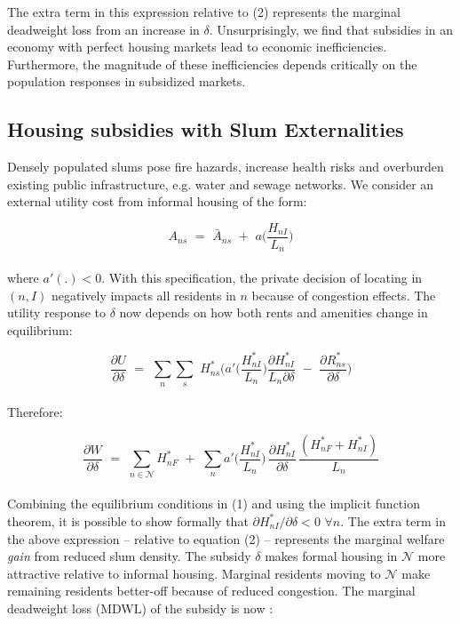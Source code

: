 \documentclass[12pt]{article}
\begin{document}
  The extra term in this expression relative to (2) represents the marginal deadweight loss from an increase in $\delta$. Unsurprisingly, we find that subsidies in an economy with perfect housing markets lead to economic inefficiencies. Furthermore, the magnitude of these inefficiencies depends critically on the population responses in subsidized markets.

 \subsection*{Housing subsidies with Slum Externalities}

 Densely populated slums pose fire hazards, increase health risks and overburden existing public infrastructure, e.g. water and sewage networks. We consider an external utility cost from informal housing of the form:

\begin{equation*}
A_{ns} \,\,=\,\, \bar{A}_{ns} \,\,+\,\, a\Big(\frac{H_{nI}}{L_n}\Big)
\end{equation*} \\[-1.99em]

 where $a'(.)<0$. With this specification, the private decision of locating in $(n,I)$ negatively impacts all residents in $n$ because of congestion effects. The utility response to $\delta$ now depends on how both rents and amenities change in equilibrium:

\begin{equation*}
\frac{\partial U}{\partial\delta} \,\,=\,\,  \sum_{n}\sum_{s} \,\, H^*_{ns}\Big(a'\Big(\frac{H^*_{nI}}{L_n}\Big)\frac{\partial H^*_{nI}}{L_n\partial \delta}\,\,-\,\,\frac{\partial R_{ns}^*}{\partial \delta}\Big) 
\end{equation*} \\[-1.99em]

 Therefore:

\begin{equation*}
\frac{\partial W}{\partial\delta} \,\,=\,\, \sum_{n\in\mathcal{N}} H^*_{nF} \,\,+\,\, \sum_{n} a'\Big(\frac{H^*_{nI}}{L_n}\Big)\,\frac{\partial H^*_{nI}}{\partial \delta}\,\frac{(H^*_{nF}+H^*_{nI})}{L_n}
\end{equation*} \\[-1.99em]

 Combining the equilibrium conditions in (1) and using the implicit function theorem, it is possible to show formally that $\partial H^*_{nI}/\partial \delta < 0 \,\,\forall n$. The extra term in the above expression -- relative to equation (2) -- represents the marginal welfare {\it gain} from reduced slum density. The subsidy $\delta$ makes formal housing in $\mathcal{N}$ more attractive relative to informal housing. Marginal residents moving to $\mathcal{N}$ make remaining residents better-off because of reduced congestion. The marginal deadweight loss (MDWL) of the subsidy is now :
\end{document}
